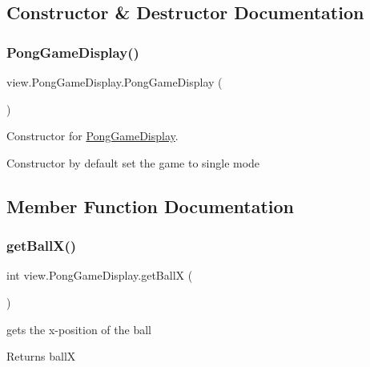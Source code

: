 \subsection{Constructor \& Destructor Documentation}
\hypertarget{classview_1_1_pong_game_display_a1d578a032b81c4025ba91e6366672e07}{}\label{classview_1_1_pong_game_display_a1d578a032b81c4025ba91e6366672e07} 
\subsubsection{\texorpdfstring{Pong\+Game\+Display()}{PongGameDisplay()}}
{\footnotesize\ttfamily view.\+Pong\+Game\+Display.\+Pong\+Game\+Display (\begin{DoxyParamCaption}{ }\end{DoxyParamCaption})}



Constructor for \hyperlink{classview_1_1_pong_game_display}{Pong\+Game\+Display}. 

Constructor by default set the game to single mode 

\subsection{Member Function Documentation}
\hypertarget{classview_1_1_pong_game_display_a83584a112f5bd8877e1bbb1d74dfa080}{}\label{classview_1_1_pong_game_display_a83584a112f5bd8877e1bbb1d74dfa080} 
\subsubsection{\texorpdfstring{get\+Ball\+X()}{getBallX()}}
{\footnotesize\ttfamily int view.\+Pong\+Game\+Display.\+get\+BallX (\begin{DoxyParamCaption}{ }\end{DoxyParamCaption})}



gets the x-\/position of the ball 

\begin{DoxyReturn}{Returns}
ballX 
\end{DoxyReturn}
\hypertarget{classview_1_1_pong_game_display_a940198a68c987548b182d18069ba5885}{}\label{classview_1_1_pong_game_display_a940198a68c987548b182d18069ba5885} 
